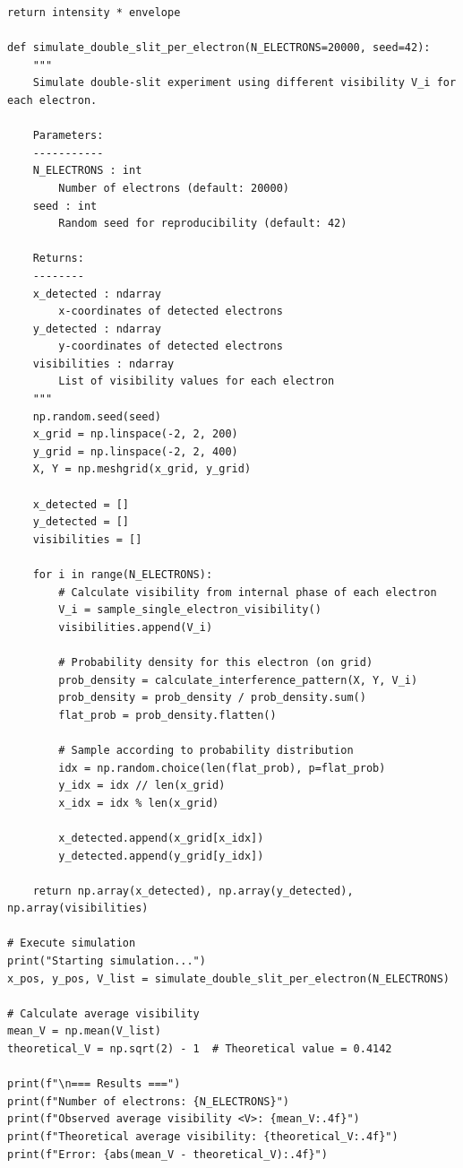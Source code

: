 \documentclass[%
 reprint,
 amsmath,amssymb,
 aps,
 prb,
]{revtex4-2}
\numberwithin{equation}{section}
\begin{document}
\begin{lstlisting}[caption={Monte Carlo simulation for ensemble-averaged visibility},label={lst:monte_carlo}]
    return intensity * envelope

def simulate_double_slit_per_electron(N_ELECTRONS=20000, seed=42):
    """
    Simulate double-slit experiment using different visibility V_i for each electron.
    
    Parameters:
    -----------
    N_ELECTRONS : int
        Number of electrons (default: 20000)
    seed : int
        Random seed for reproducibility (default: 42)
    
    Returns:
    --------
    x_detected : ndarray
        x-coordinates of detected electrons
    y_detected : ndarray
        y-coordinates of detected electrons
    visibilities : ndarray
        List of visibility values for each electron
    """
    np.random.seed(seed)
    x_grid = np.linspace(-2, 2, 200)
    y_grid = np.linspace(-2, 2, 400)
    X, Y = np.meshgrid(x_grid, y_grid)

    x_detected = []
    y_detected = []
    visibilities = []

    for i in range(N_ELECTRONS):
        # Calculate visibility from internal phase of each electron
        V_i = sample_single_electron_visibility()
        visibilities.append(V_i)
        
        # Probability density for this electron (on grid)
        prob_density = calculate_interference_pattern(X, Y, V_i)
        prob_density = prob_density / prob_density.sum()
        flat_prob = prob_density.flatten()
        
        # Sample according to probability distribution
        idx = np.random.choice(len(flat_prob), p=flat_prob)
        y_idx = idx // len(x_grid)
        x_idx = idx % len(x_grid)
        
        x_detected.append(x_grid[x_idx])
        y_detected.append(y_grid[y_idx])

    return np.array(x_detected), np.array(y_detected), np.array(visibilities)

# Execute simulation
print("Starting simulation...")
x_pos, y_pos, V_list = simulate_double_slit_per_electron(N_ELECTRONS)

# Calculate average visibility
mean_V = np.mean(V_list)
theoretical_V = np.sqrt(2) - 1  # Theoretical value = 0.4142

print(f"\n=== Results ===")
print(f"Number of electrons: {N_ELECTRONS}")
print(f"Observed average visibility <V>: {mean_V:.4f}")
print(f"Theoretical average visibility: {theoretical_V:.4f}")
print(f"Error: {abs(mean_V - theoretical_V):.4f}")


\end{lstlisting}
\end{document}

